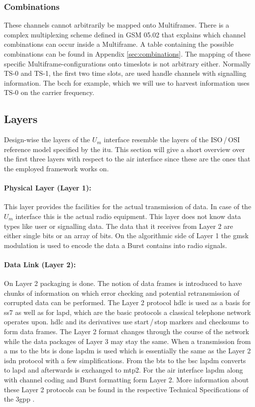 \subsubsection{Combinations}
These channels cannot arbitrarily be mapped onto Multiframes.
There is a complex multiplexing scheme defined in GSM 05.02 \cite{gsm0502} that explains which channel combinations can occur inside a Multiframe.
A table containing the possible combinations can be found in Appendix \ref{sec:combinations}.
The mapping of these specific Multiframe-configurations onto timeslots is not arbitrary either.
Normally TS-0 and TS-1, the first two time slots, are used handle channels with signalling information.
The \gls{bcch} for example, which we will use to harvest information uses TS-0 on the carrier frequency.

\subsection{Layers}
\label{sec:layers}
Design-wise the layers of the $U_m$ interface resemble the layers of the ISO\,/\,OSI reference model specified by the \gls{itu}.
This section will give a short overview over the first three layers with respect to the air interface \cite{protocols1999} since these are the ones that the employed framework works on.

\paragraph{Physical Layer (Layer 1):} This layer provides the facilities for the actual transmission of data.
In case of the $U_m$ interface this is the actual radio equipment.
This layer does not know data types like user or signalling data.
The data that it receives from Layer 2 are either single bits or an array of bits.
On the algorithmic side of Layer 1 the \gls{gmsk} modulation is used to encode the data a Burst contains into radio signals.

\paragraph{Data Link (Layer 2):} On Layer 2 packaging is done.
The notion of data frames is introduced to have chunks of information on which error checking and potential retransmission of corrupted data can be performed.
The Layer 2 protocol \gls{hdlc} is used as a basis for \gls{ss7} as well as for \gls{lapd}, which are the basic protocols a classical telephone network operates upon.
\gls{hdlc} and its derivatives use start\,/\,stop markers and checksums to form data frames.
The Layer 2 format changes through the course of the network while the data packages of Layer 3 may stay the same.
When a transmission from a \gls{ms} to the \gls{bts} is done \gls{lapdm} is used which is essentially the same as the Layer 2 \gls{isdn} protocol with a few simplifications.
From the \gls{bts} to the \gls{bsc} \gls{lapdm} converts to \gls{lapd} and afterwards is exchanged to \gls{mtp2}.
For the air interface \gls{lapdm} along with channel coding and Burst formatting form Layer 2.
More information about these Layer 2 protocols can be found in the respective Technical Specifications of the \gls{3gpp} \cite{GSM0405,GSM0406}.


